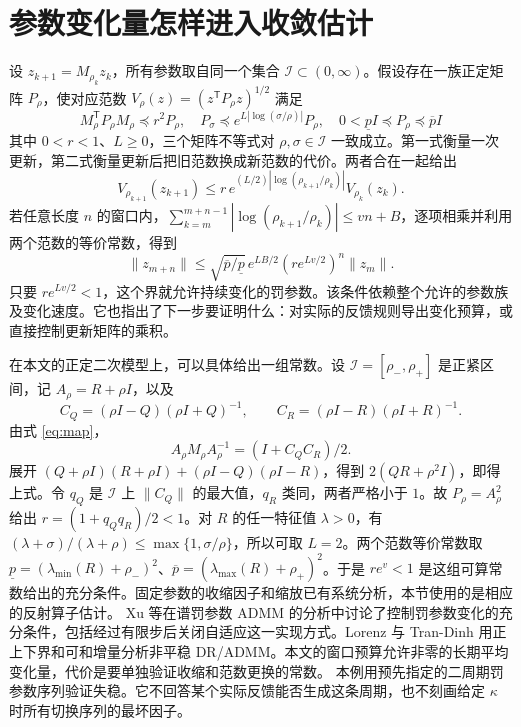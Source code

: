 \documentclass[UTF8,zihao=-4,fontset=windows]{ctexart}
\newcommand{\norm}[1]{\lVert#1\rVert}
\begin{document}
\section{参数变化量怎样进入收敛估计}
设 $z_{k+1}=M_{\rho_k}z_k$，所有参数取自同一个集合 $\mathcal I\subset(0,\infty)$。假设存在一族正定矩阵 $P_\rho$，使对应范数 $V_\rho(z)=(z^\mathsf{T}P_\rho z)^{1/2}$ 满足
\[
 M_\rho^\mathsf{T}P_\rho M_\rho\preceq r^2P_\rho,\quad
 P_\sigma\preceq e^{L|\log(\sigma/\rho)|}P_\rho,\quad
 0<\underline pI\preceq P_\rho\preceq\overline pI
\]
其中 $0<r<1$、$L\ge0$，三个矩阵不等式对 $\rho,\sigma\in\mathcal I$ 一致成立。第一式衡量一次更新，第二式衡量更新后把旧范数换成新范数的代价。两者合在一起给出
\[
 V_{\rho_{k+1}}(z_{k+1})
 \le r\,e^{(L/2)|\log(\rho_{k+1}/\rho_k)|}V_{\rho_k}(z_k).
\]
若任意长度 $n$ 的窗口内，$\sum_{k=m}^{m+n-1}|\log(\rho_{k+1}/\rho_k)|\le vn+B$，逐项相乘并利用两个范数的等价常数，得到
\[
 \norm{z_{m+n}}\le
 \sqrt{\overline p/\underline p}\,e^{LB/2}
 (r e^{Lv/2})^n\norm{z_m}.
\]
只要 $r e^{Lv/2}<1$，这个界就允许持续变化的罚参数。该条件依赖整个允许的参数族及变化速度。它也指出了下一步要证明什么：对实际的反馈规则导出变化预算，或直接控制更新矩阵的乘积。

在本文的正定二次模型上，可以具体给出一组常数。设 $\mathcal I=[\rho_-,\rho_+]$ 是正紧区间，记 $A_\rho=R+\rho I$，以及
\[
 C_Q=(\rho I-Q)(\rho I+Q)^{-1},\qquad
 C_R=(\rho I-R)(\rho I+R)^{-1}.
\]
由式 \eqref{eq:map}，
\[
 A_\rho M_\rho A_\rho^{-1}=(I+C_Q C_R)/2 .
\]
展开 $(Q+\rho I)(R+\rho I)+(\rho I-Q)(\rho I-R)$，得到 $2(QR+\rho^2 I)$，即得上式。令 $q_Q$ 是 $\mathcal I$ 上 $\norm{C_Q}$ 的最大值，$q_R$ 类同，两者严格小于 $1$。故 $P_\rho=A_\rho^2$ 给出 $r=(1+q_Qq_R)/2<1$。对 $R$ 的任一特征值 $\lambda>0$，有 $(\lambda+\sigma)/(\lambda+\rho)\le\max\{1,\sigma/\rho\}$，所以可取 $L=2$。两个范数等价常数取 $\underline p=(\lambda_{\min}(R)+\rho_-)^2$、$\overline p=(\lambda_{\max}(R)+\rho_+)^2$。于是 $r e^v<1$ 是这组可算常数给出的充分条件。固定参数的收缩因子和缩放已有系统分析，本节使用的是相应的反射算子估计。\cite{ghadimi,gb}
Xu 等在谱罚参数 ADMM 的分析中讨论了控制罚参数变化的充分条件，包括经过有限步后关闭自适应这一实现方式。Lorenz 与 Tran-Dinh 用正上下界和可和增量分析非平稳 DR/ADMM。本文的窗口预算允许非零的长期平均变化量，代价是要单独验证收缩和范数更换的常数。\cite{xu,lorenz}
本例用预先指定的二周期罚参数序列验证失稳。它不回答某个实际反馈能否生成这条周期，也不刻画给定 $\kappa$ 时所有切换序列的最坏因子。

\appendix
\end{document}
